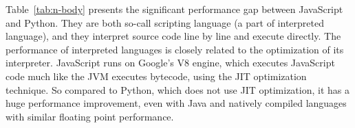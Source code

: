 
Table~\ref{tab:n-body} presents the significant performance gap between JavaScript and Python.
They are both so-call scripting language (a part of interpreted language),
and they interpret source code line by line and execute directly.
The performance of interpreted languages is closely related to the optimization of its interpreter.
JavaScript runs on Google's V8 engine, which executes JavaScript code much like the
JVM executes bytecode, using the JIT optimization technique.
So compared to Python, which does not use JIT optimization, it has a huge performance
improvement, even with Java and natively compiled languages with similar floating point performance.

